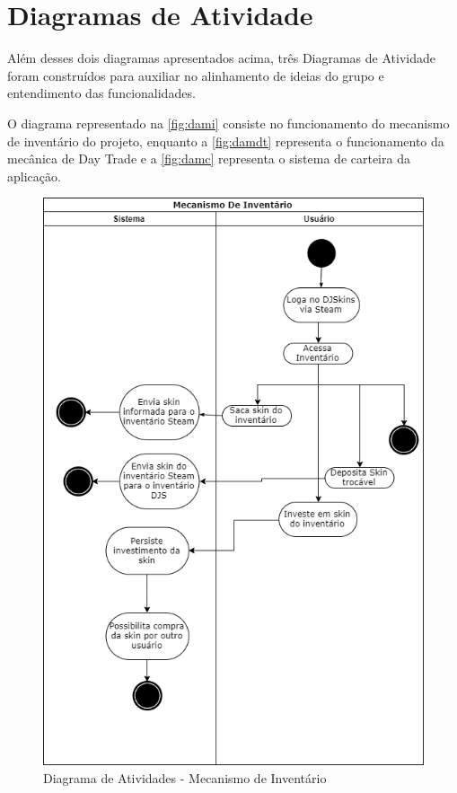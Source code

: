 \section{Diagramas de Atividade}
Além desses dois diagramas apresentados acima, três Diagramas de Atividade foram construídos para auxiliar no alinhamento de ideias do grupo e entendimento das funcionalidades. 

O diagrama representado na \autoref{fig:dami} consiste no funcionamento do mecanismo de inventário do projeto, enquanto a \autoref{fig:damdt} representa o funcionamento da mecânica de Day Trade e a \autoref{fig:damc} representa o sistema de carteira da aplicação.

	\begin{figure}[!htb]
		\centering
		\includegraphics[scale=0.6]{Imagens/mec-inventario.png}
		\caption{Diagrama de Atividades - Mecanismo de Inventário}
		\label{fig:dami}
	\end{figure}
	
